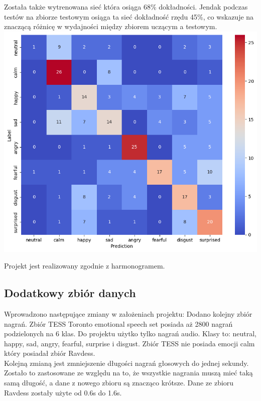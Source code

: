 \documentclass[12pt,titlepage]{article}
\begin{document}
Została także wytrenowana sieć która osiąga 68\% dokładności. Jendak podczas testów na zbiorze testowym osiąga ta sieć dokładność rzędu 45\%, co wskazuje na znaczącą różnicę w wydajności między zbiorem uczącym a testowym.\\

\includegraphics[width=\linewidth]{img/error_matrix.png}

Projekt jest realizowany zgodnie z harmonogramem.\\

\subsection{Dodatkowy zbiór danych}
Wprowadzono następujące zmiany w założeniach projektu:
Dodano kolejny zbiór nagrań. Zbiór TESS  Toronto emotional speech set posiada aż 2800 nagrań podzielonych na 6 klas.  Do projektu użytko tylko nagrań audio. Klasy to: neutral, happy, sad, angry, fearful, surprise i disgust. Zbiór TESS nie posiada emocji calm który posiadał zbiór Ravdess.\\
Kolejną zmianą jest zmniejszenie długości nagrań głosowych do jednej sekundy. Zostało to zastosowane ze względu na to, że wszystkie nagrania muszą mieć taką samą długość, a dane z nowego zbioru są znacząco krótsze. Dane ze zbioru Ravdess zostały użyte od 0.6s do 1.6s.
\end{document}
